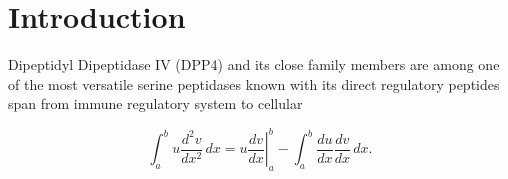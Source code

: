 \section{Introduction}
\label{intro} 

Dipeptidyl Dipeptidase IV (DPP4) and its close family members are among one of the most versatile serine peptidases known with its direct regulatory peptides span from immune regulatory system to cellular

\begin{equation}
\label{eqn:drag}
	\int_a^bu\frac{d^2v}{dx^2}\,dx
	=\left.u\frac{dv}{dx}\right|_a^b
	-\int_a^b\frac{du}{dx}\frac{dv}{dx}\,dx.
\end{equation}
